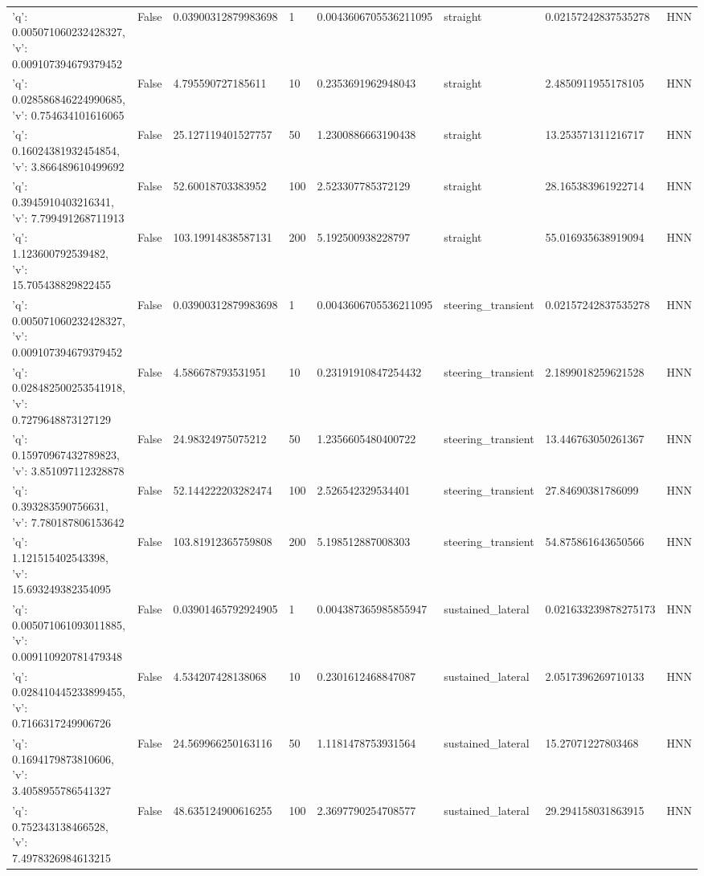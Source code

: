 \begin{tabular}{llllllll}
{'q': 0.005071060232428327, 'v': 0.009107394679379452} & False & 0.03900312879983698 & 1 & 0.0043606705536211095 & straight & 0.02157242837535278 & HNN \\
{'q': 0.028586846224990685, 'v': 0.754634101616065} & False & 4.795590727185611 & 10 & 0.2353691962948043 & straight & 2.4850911955178105 & HNN \\
{'q': 0.16024381932454854, 'v': 3.866489610499692} & False & 25.127119401527757 & 50 & 1.2300886663190438 & straight & 13.253571311216717 & HNN \\
{'q': 0.3945910403216341, 'v': 7.799491268711913} & False & 52.60018703383952 & 100 & 2.523307785372129 & straight & 28.165383961922714 & HNN \\
{'q': 1.123600792539482, 'v': 15.705438829822455} & False & 103.19914838587131 & 200 & 5.192500938228797 & straight & 55.016935638919094 & HNN \\
{'q': 0.005071060232428327, 'v': 0.009107394679379452} & False & 0.03900312879983698 & 1 & 0.0043606705536211095 & steering\_transient & 0.02157242837535278 & HNN \\
{'q': 0.028482500253541918, 'v': 0.7279648873127129} & False & 4.586678793531951 & 10 & 0.23191910847254432 & steering\_transient & 2.1899018259621528 & HNN \\
{'q': 0.15970967432789823, 'v': 3.851097112328878} & False & 24.98324975075212 & 50 & 1.2356605480400722 & steering\_transient & 13.446763050261367 & HNN \\
{'q': 0.393283590756631, 'v': 7.780187806153642} & False & 52.144222203282474 & 100 & 2.526542329534401 & steering\_transient & 27.84690381786099 & HNN \\
{'q': 1.121515402543398, 'v': 15.693249382354095} & False & 103.81912365759808 & 200 & 5.198512887008303 & steering\_transient & 54.875861643650566 & HNN \\
{'q': 0.005071061093011885, 'v': 0.009110920781479348} & False & 0.03901465792924905 & 1 & 0.004387365985855947 & sustained\_lateral & 0.021633239878275173 & HNN \\
{'q': 0.028410445233899455, 'v': 0.7166317249906726} & False & 4.534207428138068 & 10 & 0.2301612468847087 & sustained\_lateral & 2.0517396269710133 & HNN \\
{'q': 0.1694179873810606, 'v': 3.4058955786541327} & False & 24.569966250163116 & 50 & 1.1181478753931564 & sustained\_lateral & 15.27071227803468 & HNN \\
{'q': 0.752343138466528, 'v': 7.4978326984613215} & False & 48.635124900616255 & 100 & 2.3697790254708577 & sustained\_lateral & 29.294158031863915 & HNN \\

\end{tabular}
